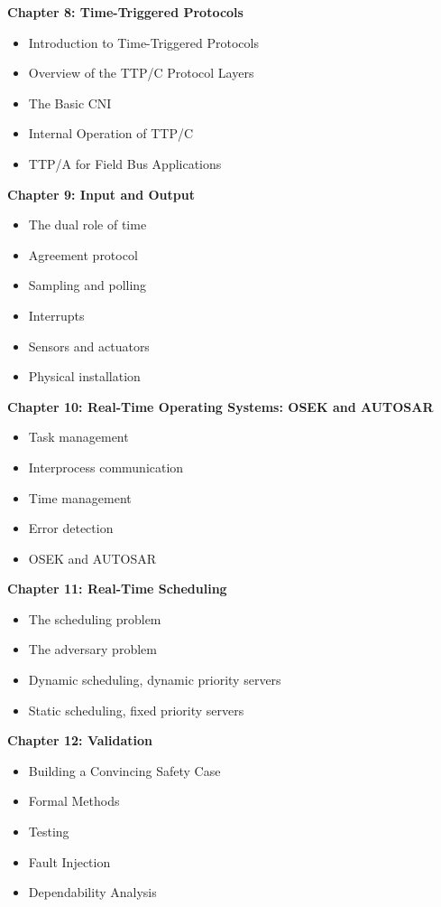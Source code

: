 \textbf{Chapter 8: Time-Triggered Protocols}

\begin{itemize}
\item
  Introduction to Time-Triggered Protocols
\item
  Overview of the TTP/C Protocol Layers
\item
  The Basic CNI
\item
  Internal Operation of TTP/C
\item
  TTP/A for Field Bus Applications
\end{itemize}

\textbf{Chapter 9: Input and Output}

\begin{itemize}
\item
  The dual role of time
\item
  Agreement protocol
\item
  Sampling and polling
\item
  Interrupts
\item
  Sensors and actuators
\item
  Physical installation
\end{itemize}

\textbf{Chapter 10: Real-Time Operating Systems: OSEK and AUTOSAR}

\begin{itemize}
\item
  Task management
\item
  Interprocess communication
\item
  Time management
\item
  Error detection
\item
  OSEK and AUTOSAR
\end{itemize}

\textbf{Chapter 11: Real-Time Scheduling}

\begin{itemize}
\item
  The scheduling problem
\item
  The adversary problem
\item
  Dynamic scheduling, dynamic priority servers
\item
  Static scheduling, fixed priority servers
\end{itemize}

\textbf{Chapter 12: Validation}

\begin{itemize}
\item
  Building a Convincing Safety Case
\item
  Formal Methods
\item
  Testing
\item
  Fault Injection
\item
  Dependability Analysis
\end{itemize}
